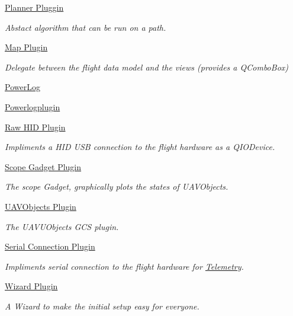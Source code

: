 \begin{DoxyCompactItemize}
\hyperlink{group___path}{Planner Pluggin}
\begin{DoxyCompactList}\small\item\em Abstact algorithm that can be run on a path. \end{DoxyCompactList}\item 
\hyperlink{group___path_planner}{Map Plugin}
\begin{DoxyCompactList}\small\item\em Delegate between the flight data model and the views (provides a Q\-Combo\-Box) \end{DoxyCompactList}\item 
\hyperlink{group___power_log}{Power\-Log}
\item 
\hyperlink{group__powerlogplugin}{Powerlogplugin}
\item 
\hyperlink{group___raw_h_i_d_plugin}{Raw H\-I\-D Plugin}
\begin{DoxyCompactList}\small\item\em Impliments a H\-I\-D U\-S\-B connection to the flight hardware as a Q\-I\-O\-Device. \end{DoxyCompactList}\item 
\hyperlink{group___scope_plugin}{Scope Gadget Plugin}
\begin{DoxyCompactList}\small\item\em The scope Gadget, graphically plots the states of U\-A\-V\-Objects. \end{DoxyCompactList}\item 
\hyperlink{group___u_a_v_objects_plugin}{U\-A\-V\-Objects Plugin}
\begin{DoxyCompactList}\small\item\em The U\-A\-V\-U\-Objects G\-C\-S plugin. \end{DoxyCompactList}\item 
\hyperlink{group___serial_plugin}{Serial Connection Plugin}
\begin{DoxyCompactList}\small\item\em Impliments serial connection to the flight hardware for \hyperlink{class_telemetry}{Telemetry}. \end{DoxyCompactList}\item 
\hyperlink{group___setup}{Wizard  Plugin}
\begin{DoxyCompactList}\small\item\em A Wizard to make the initial setup easy for everyone. \end{DoxyCompactList}\item 

\end{DoxyCompactItemize}
